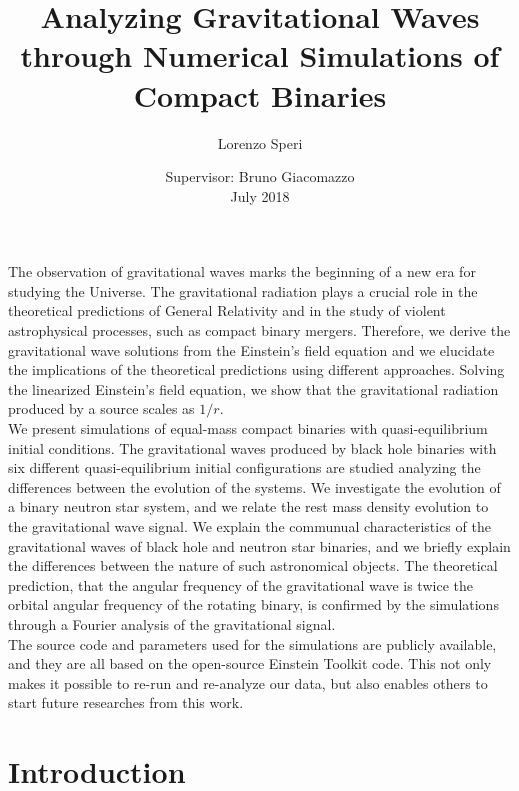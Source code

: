 \documentclass[twoside,english, a4paper, 12pt]{shared/uiofysmaster}
\author{Lorenzo Speri}
\title{\bf{Analyzing Gravitational Waves through Numerical Simulations of Compact Binaries}}
\date{Supervisor:
Bruno Giacomazzo\\
July 2018}
\begin{document}

\maketitle
\clearpage
\thispagestyle{empty}
\tableofcontents
\pagebreak

\afterpage{
\pagestyle{empty}
\newpage~\newpage~
}

\begin{abstract1}
The observation of gravitational waves marks the beginning of a new era for studying the Universe.
The gravitational radiation plays a crucial role in the theoretical predictions of General Relativity and in the study of violent astrophysical processes, such as compact binary mergers. 
Therefore, we derive the gravitational wave solutions from the Einstein's field equation and we elucidate the implications of the theoretical predictions using different approaches.
Solving the linearized Einstein's field equation, we show that the gravitational radiation produced by a source scales as $1/r$. \\
We present simulations of equal-mass compact binaries with quasi-equilibrium initial conditions.
The gravitational waves produced by black hole binaries with six different quasi-equilibrium initial configurations are studied analyzing the differences between the evolution of the systems.
We investigate the evolution of a binary neutron star system, and we relate the rest mass density evolution to the gravitational wave signal.
We explain the communual characteristics of the gravitational waves of black hole and neutron star binaries, and we briefly explain the differences between the nature of such astronomical objects.
The theoretical prediction, that the angular frequency of the gravitational wave is twice the orbital angular frequency of the rotating binary, is confirmed by the simulations through a Fourier analysis of the gravitational signal.\\
The source code and parameters used for the simulations are publicly available, and they are all based on the open-source Einstein Toolkit code.  
This not only makes it possible to re-run and re-analyze our data, but also enables others to start future researches from this work.
\end{abstract1}
\setcounter{page}{1}


\clearpage
\section{Introduction}

\end{document}
